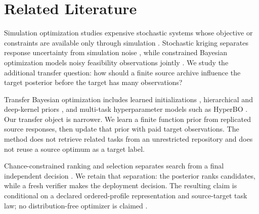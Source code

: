 \section{Related Literature}\label{sec:mp_related}

Simulation optimization studies expensive stochastic systems whose objective or
constraints are available only through simulation \citep{Fu2002,AmaranEtAl2016}.
Stochastic kriging separates response uncertainty from simulation noise
\citep{AnkenmanNelsonStaum2010}, while constrained Bayesian optimization models
noisy feasibility observations jointly \citep{LethamEtAl2019}.  We study the
additional transfer question: how should a finite source archive influence the
target posterior before the target has many observations?

Transfer Bayesian optimization includes learned initializations
\citep{WistubaEtAl2015,FeurerEtAl2022}, hierarchical and deep-kernel priors
\citep{WistubaGrabocka2021,RothfussEtAl2021,RothfussEtAl2021FPACOH}, and
multi-task hyperparameter models such as HyperBO
\citep{WangEtAl2024HyperBO}.  Our transfer object is narrower.  We learn a
finite function prior from replicated source responses, then update that prior
with paid target observations.  The method does not retrieve related tasks
from an unrestricted repository and does not reuse a source optimum as a
target label.

Chance-constrained ranking and selection separates search from a final
independent decision \citep{HongLuoNelson2015,BoeselNelsonKim2003}.  We retain
that separation: the posterior ranks candidates, while a fresh verifier makes
the deployment decision.  The resulting claim is conditional on a declared
ordered-profile representation and source-target task law; no distribution-free
optimizer is claimed \citep{WolpertMacready1997}.
